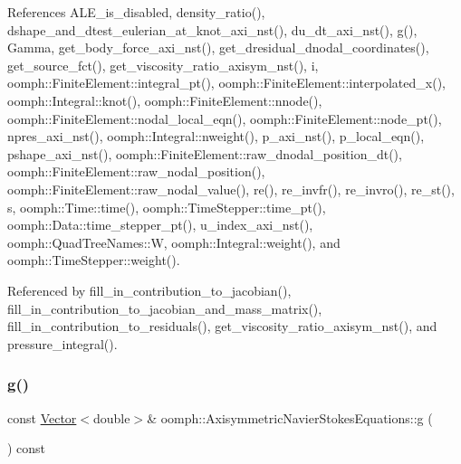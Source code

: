 References A\+L\+E\+\_\+is\+\_\+disabled, density\+\_\+ratio(), dshape\+\_\+and\+\_\+dtest\+\_\+eulerian\+\_\+at\+\_\+knot\+\_\+axi\+\_\+nst(), du\+\_\+dt\+\_\+axi\+\_\+nst(), g(), Gamma, get\+\_\+body\+\_\+force\+\_\+axi\+\_\+nst(), get\+\_\+dresidual\+\_\+dnodal\+\_\+coordinates(), get\+\_\+source\+\_\+fct(), get\+\_\+viscosity\+\_\+ratio\+\_\+axisym\+\_\+nst(), i, oomph\+::\+Finite\+Element\+::integral\+\_\+pt(), oomph\+::\+Finite\+Element\+::interpolated\+\_\+x(), oomph\+::\+Integral\+::knot(), oomph\+::\+Finite\+Element\+::nnode(), oomph\+::\+Finite\+Element\+::nodal\+\_\+local\+\_\+eqn(), oomph\+::\+Finite\+Element\+::node\+\_\+pt(), npres\+\_\+axi\+\_\+nst(), oomph\+::\+Integral\+::nweight(), p\+\_\+axi\+\_\+nst(), p\+\_\+local\+\_\+eqn(), pshape\+\_\+axi\+\_\+nst(), oomph\+::\+Finite\+Element\+::raw\+\_\+dnodal\+\_\+position\+\_\+dt(), oomph\+::\+Finite\+Element\+::raw\+\_\+nodal\+\_\+position(), oomph\+::\+Finite\+Element\+::raw\+\_\+nodal\+\_\+value(), re(), re\+\_\+invfr(), re\+\_\+invro(), re\+\_\+st(), s, oomph\+::\+Time\+::time(), oomph\+::\+Time\+Stepper\+::time\+\_\+pt(), oomph\+::\+Data\+::time\+\_\+stepper\+\_\+pt(), u\+\_\+index\+\_\+axi\+\_\+nst(), oomph\+::\+Quad\+Tree\+Names\+::W, oomph\+::\+Integral\+::weight(), and oomph\+::\+Time\+Stepper\+::weight().



Referenced by fill\+\_\+in\+\_\+contribution\+\_\+to\+\_\+jacobian(), fill\+\_\+in\+\_\+contribution\+\_\+to\+\_\+jacobian\+\_\+and\+\_\+mass\+\_\+matrix(), fill\+\_\+in\+\_\+contribution\+\_\+to\+\_\+residuals(), get\+\_\+viscosity\+\_\+ratio\+\_\+axisym\+\_\+nst(), and pressure\+\_\+integral().

\mbox{\label{classoomph_1_1AxisymmetricNavierStokesEquations_a518c31629e6ef42334cd031e2901efea}} 
\subsubsection{\texorpdfstring{g()}{g()}}
{\footnotesize\ttfamily const \hyperlink{classoomph_1_1Vector}{Vector}$<$double$>$\& oomph\+::\+Axisymmetric\+Navier\+Stokes\+Equations\+::g (\begin{DoxyParamCaption}{ }\end{DoxyParamCaption}) const\hspace{0.3cm}{\ttfamily [inline]}}



